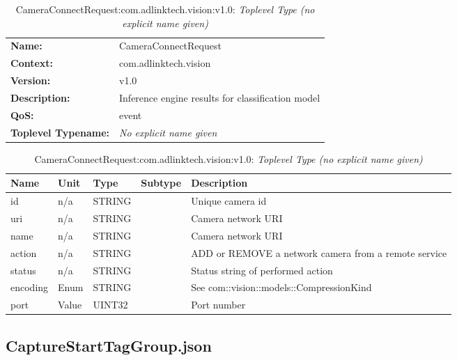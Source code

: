 \begin{table}[H]
\begin{tabularx}{\textwidth}{l X} 
       \textbf{Name:} & CameraConnectRequest \\ 
	   \textbf{Context:} & com.adlinktech.vision \\ 
	   \textbf{Version:} & v1.0 \\ 
	   \textbf{Description:} & Inference engine results for classification model \\ 
	   \textbf{QoS:} & event \\
	   \textbf{Toplevel Typename:} & \textit{No explicit name given} \\ 
\end{tabularx}
\caption{CameraConnectRequest:com.adlinktech.vision:v1.0}\label{CameraConnectRequestTagGroup.json:table:CameraConnectRequest}
\bigskip
\begin{tabularx}{\textwidth}{l l l l X} 
	 \textbf{Name} & \textbf{Unit} & \textbf{Type} & \textbf{Subtype} & \textbf{Description} \\
	 \midrule
   id & n/a & STRING &  & Unique camera id \\
   uri & n/a & STRING &  & Camera network URI \\
   name & n/a & STRING &  & Camera network URI \\
   action & n/a & STRING &  & ADD or REMOVE a network camera from a remote service \\
   status & n/a & STRING &  & Status string of performed action \\
   encoding & Enum & STRING &  & See com::vision::models::CompressionKind \\
   port & Value & UINT32 &  & Port number \\
\end{tabularx}
\caption{CameraConnectRequest:com.adlinktech.vision:v1.0: \textit{Toplevel Type (no explicit name given)}}\label{CameraConnectRequestTagGroup.json:table:CameraConnectRequest-no-type-given}


\end{table}

\subsection{CaptureStartTagGroup.json}

